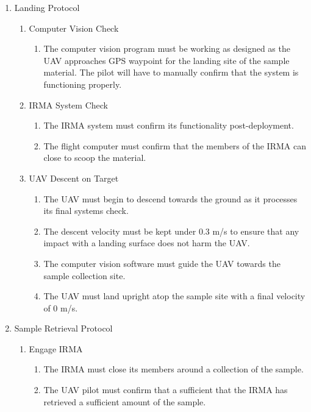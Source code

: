 \begin{enumerate}[noitemsep, label=\arabic*.]
\begin{enumerate}[noitemsep, label=2.\arabic*.]
	\end{enumerate}
	\item Landing Protocol
	\begin{enumerate}[noitemsep, label=3.\arabic*.]
		\item Computer Vision Check
		\begin{enumerate}[noitemsep, label=3.1.\arabic*.]
			\item The computer vision program must be working as designed as the UAV approaches GPS waypoint for the landing site of the sample material. The pilot will have to manually confirm that the system is functioning properly.
		\end{enumerate}
		\item IRMA System Check
		\begin{enumerate}[noitemsep, label=3.2.\arabic*.]
			\item The IRMA system must confirm its functionality post-deployment.
			\item The flight computer must confirm that the members of the IRMA can close to scoop the material. 
		\end{enumerate}
		\item UAV Descent on Target
		\begin{enumerate}[noitemsep, label=3.3.\arabic*.]
			\item The UAV must begin to descend towards the ground as it processes its final systems check.
			\item The descent velocity must be kept under 0.3 m/s to ensure that any impact with a landing surface does not harm the UAV.
			\item The computer vision software must guide the UAV towards the sample collection site.
			\item The UAV must land upright atop the sample site with a final velocity of 0 m/s.
		\end{enumerate}
	\end{enumerate}
	\item Sample Retrieval Protocol
	\begin{enumerate}[noitemsep, label=4.\arabic*.]
		\item Engage IRMA
		\begin{enumerate}[noitemsep, label=4.1.\arabic*.]
			\item The IRMA must close its members around a collection of the sample.
			\item The UAV pilot must confirm that a sufficient that the IRMA has retrieved a sufficient amount of the sample.

\end{enumerate}
\end{enumerate}
\end{enumerate}
